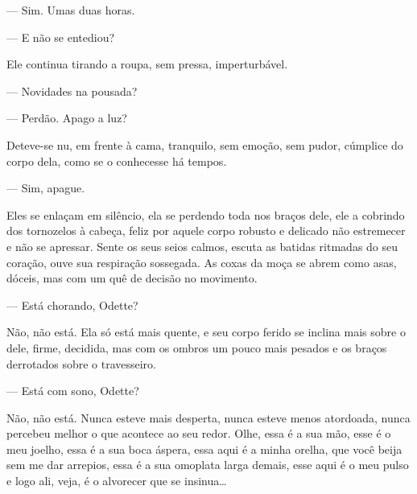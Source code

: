 --- Sim. Umas duas horas.

--- E não se entediou?


Ele continua tirando a roupa, sem pressa, imperturbável.

--- Novidades na pousada?


--- Perdão. Apago a luz?

Deteve-se nu, em frente à cama, tranquilo, sem emoção, sem pudor,
cúmplice do corpo dela, como se o conhecesse há tempos.

--- Sim, apague.

Eles se enlaçam em silêncio, ela se perdendo toda nos braços dele, ele a
cobrindo dos tornozelos à cabeça, feliz por aquele corpo robusto e
delicado não estremecer e não se apressar. Sente os seus seios calmos,
escuta as batidas ritmadas do seu coração, ouve sua respiração
sossegada. As coxas da moça se abrem como asas, dóceis, mas com um quê
de decisão no movimento.



--- Está chorando, Odette?

Não, não está. Ela só está mais quente, e seu corpo ferido se inclina
mais sobre o dele, firme, decidida, mas com os ombros um pouco mais
pesados e os braços derrotados sobre o travesseiro.

--- Está com sono, Odette?

Não, não está. Nunca esteve mais desperta, nunca esteve menos atordoada,
nunca percebeu melhor o que acontece ao seu redor. Olhe, essa é a sua
mão, esse é o meu joelho, essa é a sua boca áspera, essa aqui é a minha
orelha, que você beija sem me dar arrepios, essa é a sua omoplata larga
demais, esse aqui é o meu pulso e logo ali, veja, é o alvorecer que se
insinua\ldots{}

